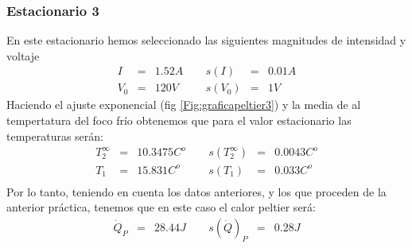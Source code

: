 \documentclass[12pt,a4paper]{article}
\begin{document}
\subsubsection{Estacionario 3}
En este estacionario hemos seleccionado las siguientes magnitudes de intensidad y voltaje  
\begin{equation} 
\begin{array}{lllllll}
I & = & 1.52 A & \ \ & s(I) & = & 0.01  A \\ 
 V_0 & = & 120 V & \ \ & s(V_0) & = & 1 V
\end{array} 
\end{equation} 
 Haciendo el ajuste exponencial (fig \ref{Fig:graficapeltier3}) y la media de al tempertatura del foco frío obtenemos que para el valor estacionario las temperaturas serán: 
\begin{equation} 
\begin{array}{lllllll}
T_2^{\infty} & = & 10.3475 C^o &  \ \ &  s(T_2^{\infty}) & =  & 0.0043  C^o \\ 
 T_1 & = & 15.831  C^o & \ \ & s(T_1) & = & 0.033  C^o \\ 
 \end{array} 
\end{equation} 
 Por lo tanto, teniendo en cuenta los datos anteriores, y los que proceden de la anterior práctica, tenemos que en este caso el calor peltier será: 
\begin{equation} 
\begin{array}{lllllll}
\dot{Q}_P & = & 28.44 J & \ \ & s(\dot{Q})_P & = & 0.28 J \\ 
\end{array} 
\end{equation} 
 
 
 
 
\end{document}
